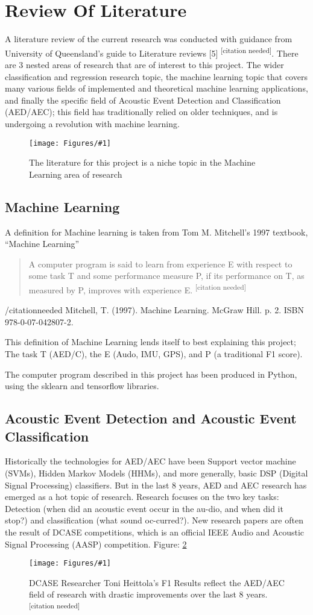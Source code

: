 \documentclass{UoNMCHA}
\newcommand{\citationneeded}{\textsuperscript{\color{blue} [citation needed]}}
\newcommand{\inlineQuote}[1]{``#1''}
\newcommand{\fref}[1] {Figure: \ref{#1}}
\newcommand{\fFigure}[3]{
	\begin{figure}[h]
        \begin{center}  
            \texttt{[image: Figures/\#1]}  
            \caption{#2}
            \label{#1}
        \end{center}
	\end{figure}
}
\numberwithin{equation}{section}
\begin{document}
\section{Review Of Literature}
A literature review of the current research was conducted with guidance from University of Queensland’s guide to Literature reviews [5] \citationneeded . There are 3 nested areas of research that are of interest to this project. The wider classification and regression research topic, the machine learning topic that covers many various fields of implemented and theoretical machine learning applications, and finally the specific field of Acoustic Event Detection and Classification (AED/AEC); this field has traditionally relied on older techniques, and is undergoing a revolution with machine learning. 
\fFigure{niche.png}{The literature for this project is a niche topic in the Machine Learning area of research}{0.8}

\subsection{Machine Learning}
A definition for Machine learning is taken from Tom M. Mitchell's 1997 textbook, \inlineQuote{Machine Learning}
\begin{quote}
    A computer program is said to learn from experience E with respect to some task T and some performance measure P, if its performance on T, as measured by P, improves with experience E. \citationneeded
\end{quote} /citationneeded  Mitchell, T. (1997). Machine Learning. McGraw Hill. p. 2. ISBN 978-0-07-042807-2.

This definition of Machine Learning lends itself to best explaining this project; The task T (AED/C), the E (Audo, IMU, GPS), and P (a traditional F1 score). 

The computer program described in this project has been produced in Python, using the sklearn and tensorflow libraries.

\subsection{Acoustic Event Detection and Acoustic Event Classification}
Historically the technologies for AED/AEC have been Support vector machine (SVMs), Hidden Markov Models (HHMs), and more generally, basic DSP (Digital Signal Processing) classifiers. But in the last 8 years, AED and AEC research has emerged as a hot topic of research. Research focuses on the two key tasks: Detection (when did an acoustic event occur in the au-dio, and when did it stop?) and classification (what sound oc-curred?). New research papers are often the result of DCASE competitions, which is an official IEEE Audio and Acoustic Signal Processing (AASP) competition.
\fref{F1_score.png}
\fFigure{F1_score.png}{DCASE Researcher Toni Heittola's F1 Results reflect the AED/AEC field of research with drastic improvements over the last 8 years. \citationneeded}{0.8}
\end{document}
